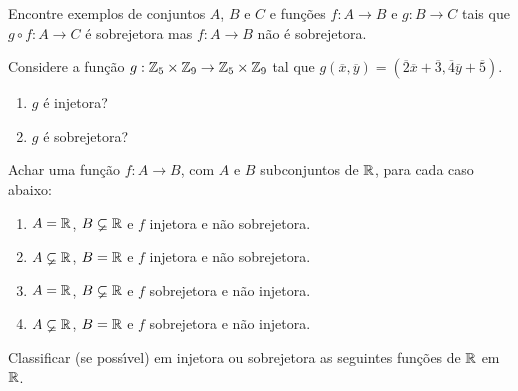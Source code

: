 \documentclass[12pt]{exam}
\begin{document}
    \vspace{.3cm}

    \questao{} Encontre exemplos de conjuntos $A$, $B$ e $C$ e funções $f : A \to B$ e $g : B \to C$ tais que $g \circ f : A \to C$ é sobrejetora mas $f : A \to B$ não é sobrejetora.

    \vspace{.3cm}

    \questao{} Considere a fun{\c c}{\~a}o $g : \mathbb{Z}_5 \times \mathbb{Z}_9 \to \mathbb{Z}_5 \times \mathbb{Z}_9$ tal que $g(\overline{x},\overline{y}) = (\overline{2} \overline{x} + \overline{3}, \overline{4}\overline{y} + \overline{5})$.
    \begin{enumerate}[label={\alph*})]
        \item $g$ \'e injetora?

        \item $g$ \'e sobrejetora?
    \end{enumerate}

    \vspace{.3cm}

    \questao{} Achar uma fun{\c c}{\~a}o $f : A \to B$, com $A$ e $B$ subconjuntos de $\mathbb{R}$, para cada caso abaixo:
    \begin{enumerate}[label={\alph*})]
        \item $A = \mathbb{R}$, $B \varsubsetneq \mathbb{R}$ e $f$ injetora e n{\~a}o sobrejetora.

        \item $A \varsubsetneq \mathbb{R}$, $B = \mathbb{R}$ e $f$ injetora e n{\~a}o sobrejetora.

        \item $A = \mathbb{R}$, $B \varsubsetneq \mathbb{R}$ e $f$ sobrejetora e n{\~a}o injetora.

        \item $A \varsubsetneq \mathbb{R}$, $B = \mathbb{R}$ e $f$ sobrejetora e n{\~a}o injetora.
    \end{enumerate}

    \vspace{.3cm}

    \questao{} Classificar (se poss{\'\i}vel) em injetora ou sobrejetora as seguintes fun{\c c}{\~o}es de $\mathbb{R}$ em $\mathbb{R}$.
\end{document}
